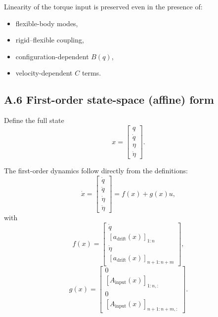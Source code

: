 \documentclass[12pt]{article}
\begin{document}
Linearity of the torque input is preserved even in the presence of:
\begin{itemize}
  \item flexible-body modes,
  \item rigid–flexible coupling,
  \item configuration-dependent \(B(q)\),
  \item velocity-dependent \(C\) terms.
\end{itemize}

\subsection{A.6 \quad First-order state-space (affine) form}

Define the full state
\[
  x = \begin{bmatrix}
    q \\ \dot{q} \\ \eta \\ \dot{\eta}
  \end{bmatrix}.
\]

The first-order dynamics follow directly from the definitions:
\[
  \dot{x}
  =
  \begin{bmatrix}
    \dot{q} \\ \ddot{q} \\ \dot{\eta} \\ \ddot{\eta}
  \end{bmatrix}
  =
  f(x) + g(x)u,
\]
with
\begin{equation}
  f(x)
  =
  \begin{bmatrix}
    \dot{q} \\[0.2em]
    \left[a_{\mathrm{drift}}(x)\right]_{1:n} \\[0.2em]
    \dot{\eta} \\[0.2em]
    \left[a_{\mathrm{drift}}(x)\right]_{n+1:n+m}
  \end{bmatrix},
\end{equation}
\begin{equation}
  g(x)
  =
  \begin{bmatrix}
    0 \\[0.2em]
    \left[A_{\mathrm{input}}(x)\right]_{1:n,:} \\[0.2em]
    0 \\[0.2em]
    \left[A_{\mathrm{input}}(x)\right]_{n+1:n+m,:}
  \end{bmatrix}.
\end{equation}
\end{document}
